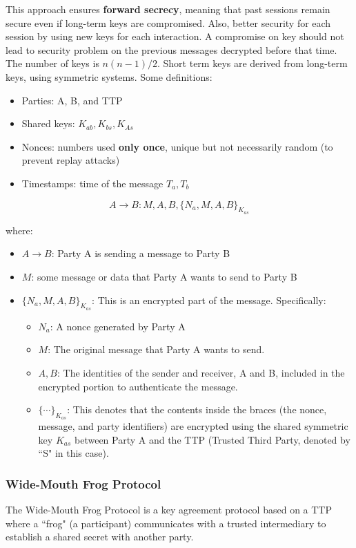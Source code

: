 This approach ensures \textbf{forward secrecy}, meaning that past sessions remain secure even if long-term keys are compromised.
Also, better security for each session by using new keys for each interaction. A compromise on key should not lead to security problem on the
previous messages decrypted before that time. \\

The number of keys is $n(n-1)/2$. Short term keys are derived from long-term keys, using symmetric systems. Some definitions:

\begin{itemize}
    \item Parties: A, B, and TTP
    \item Shared keys: $K_{ab}, K_{bs}, K_{As}$
    \item Nonces: numbers used \textbf{only once}, unique but not necessarily random (to prevent replay attacks)
    \item Timestamps: time of the message $T_a, T_b$
\end{itemize}

\[ A \rightarrow B: M, A, B, \{N_a, M, A, B\}_{K_{as}}\]

where:
\begin{itemize}
    \item $A \rightarrow B$: Party A is sending a message to Party B
    \item $M$: some message or data that Party A wants to send to Party B
    \item $\{N_a, M, A, B\}_{K_{as}}$: This is an encrypted part of the message. Specifically:
    \begin{itemize}
        \item $N_a$: A nonce generated by Party A
        \item $M$: The original message that Party A wants to send.
        \item $A, B$: The identities of the sender and receiver, A and B, included in the encrypted portion to authenticate the message.
        \item $\{\cdots \}_{K_{as}}$: This denotes that the contents inside the braces (the nonce, message, and party identifiers) 
        are encrypted using the shared symmetric key $K_{as}$ between Party A and the TTP (Trusted Third Party, denoted by ``S" in this case).
    \end{itemize}
\end{itemize}

\subsubsection{Wide-Mouth Frog Protocol}
The Wide-Mouth Frog Protocol is a key agreement protocol based on a TTP where a ``frog" (a participant)
communicates with a trusted intermediary to establish a shared secret with another party.

